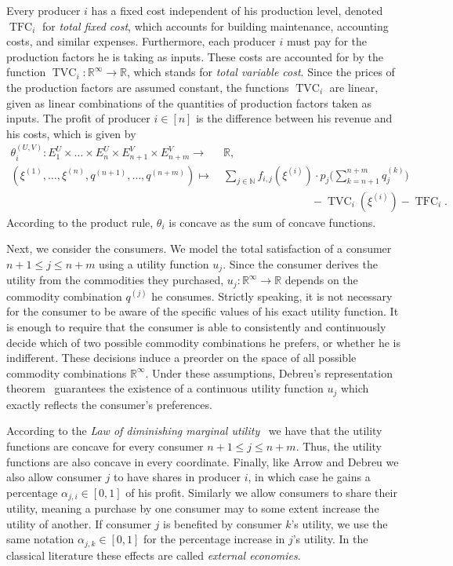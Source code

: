 \documentclass[a4paper,11pt,reqno,english]{amsart}
\theoremstyle{plain}
\theoremstyle{definition}
\begin{document}
\medskip
Every producer $i$ has a fixed cost independent of his production level, denoted $\operatorname{TFC}_i$ for \textit{total fixed cost}, which accounts for building maintenance, accounting costs, and similar expenses.
Furthermore, each producer $i$ must pay for the production factors he is taking as inputs.
These costs are accounted for by the function $\operatorname{TVC}_i\colon \mathbb{R}^{\infty}\longrightarrow\mathbb{R}$, which stands for \textit{total variable cost}.
Since the prices of the production factors are assumed constant, the functions $\operatorname{TVC}_i$ are linear, given as linear combinations of the quantities of production factors taken as inputs.
The profit of producer $i\in[n]$ is the difference between his revenue and his costs, which is given by
\begin{align*}
	\theta_i^{(U,V)} \colon E_1^U\times\dots\times E_n^U\times E_{n+1}^V\times   E_{n+m}^V\longrightarrow \  & \mathbb{R},                                                                             \\
	(\xi^{(1)},\dots,\xi^{(n)},q^{(n+1)},\dots,q^{(n+m)}) \longmapsto \                                      & \sum_{j\in\mathbb{N}} f_{i,j}(\xi^{(i)})\cdot p_j\Big(\sum_{k=n+1}^{n+m} q^{(k)}_j\Big) \\ & \qquad\qquad\qquad\qquad - \operatorname{TVC}_i(\xi^{(i)}) - \operatorname{TFC}_i.
\end{align*}
According to the product rule, $\theta_i$ is concave as the sum of concave functions.

\medskip
Next, we consider the consumers. We model the total satisfaction of a consumer $n+1\leq j\leq n+m$ using a utility function $u_j$. Since the consumer derives the utility from the commodities they purchased, $u_j\colon \mathbb{R}^{\infty}\longrightarrow \mathbb{R}$ depends on the commodity combination $q^{(j)}$ he consumes.
Strictly speaking, it is not necessary for the consumer to be aware of the specific values of his exact utility function.
It is enough to require that the consumer is able to consistently and continuously decide which of two possible commodity combinations he prefers, or whether he is indifferent.
These decisions induce a preorder on the space of all possible commodity combinations $\mathbb{R}^{\infty}$.
Under these assumptions, Debreu's representation theorem~\cite{Debreu1954} guarantees the existence of a continuous utility function $u_j$ which exactly reflects the consumer's preferences.


\medskip
According to the \emph{Law of diminishing marginal utility}~\cite[Sec.\,2.2]{HendersonQuandt1958} we have that the utility functions are concave
for every consumer $n+1\leq j\leq n+m$.
Thus, the utility functions are also concave in every coordinate.
Finally, like Arrow and Debreu we also allow consumer $j$ to have shares in producer $i$, in which case he gains a percentage $\alpha_{j,i}\in[0,1]$ of his profit. Similarly we allow consumers to share their utility, meaning a purchase by one consumer may to some extent increase the utility of another. 
If consumer $j$ is benefited by consumer $k$'s utility, we use the same notation $\alpha_{j,k}\in[0,1]$ for the percentage increase in $j$'s utility.
In the classical literature these effects are called \textit{external economies}.
\end{document}
